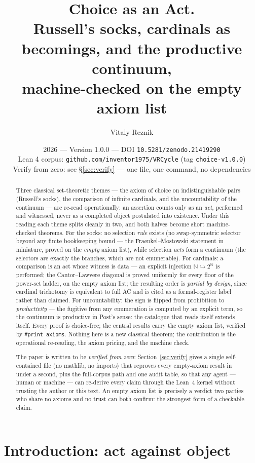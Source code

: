 \documentclass[11pt]{article}
\title{\textbf{Choice as an Act.}\\[2pt]
\large Russell's socks, cardinals as becomings, and the productive
continuum,\\ machine-checked on the empty axiom list}
\author{Vitaly Reznik}
\date{2026 --- Version 1.0.0 --- DOI \texttt{10.5281/zenodo.21419290}\\[2pt]
\small Lean 4 corpus: \texttt{github.com/inventor1975/VRCycle} (tag
\texttt{choice-v1.0.0})\\
\small Verify from zero: see \S\ref{sec:verify} --- one file, one command,
no dependencies}
\theoremstyle{remark}
\newcommand{\N}{\mathbb{N}}
\begin{document}
\maketitle

\begin{abstract}
Three classical set-theoretic themes --- the axiom of choice on
indistinguishable pairs (Russell's socks), the comparison of infinite
cardinals, and the uncountability of the continuum --- are re-read
operationally: an assertion counts only as an \emph{act}, performed and
witnessed, never as a completed object postulated into existence.  Under
this reading each theme splits cleanly in two, and both halves become
short machine-checked theorems.  For the socks: no selection \emph{rule}
exists (no swap-symmetric selector beyond any finite bookkeeping bound
--- the Fraenkel--Mostowski statement in miniature, proved on the
\emph{empty} axiom list), while selection \emph{acts} form a continuum
(the selectors are exactly the branches, which are not enumerable).  For
cardinals: a comparison is an act whose witness is data --- an explicit
injection $\N \hookrightarrow 2^{\N}$ is performed; the Cantor--Lawvere
diagonal is proved uniformly for every floor of the power-set ladder, on
the empty axiom list; the resulting order is \emph{partial by design},
since cardinal trichotomy is equivalent to full AC and is cited as a
formal-register label rather than claimed.  For uncountability: the sign
is flipped from prohibition to \emph{productivity} --- the fugitive from
any enumeration is computed by an explicit term, so the continuum is
productive in Post's sense: the catalogue that reads itself extends
itself.  Every proof is choice-free; the central results carry the empty
axiom list, verified by \texttt{\#print axioms}.  Nothing here is a new
classical theorem; the contribution is the operational re-reading, the
axiom pricing, and the machine check.

The paper is written to be \emph{verified from zero}: Section~\ref{sec:verify}
gives a single self-contained file (no mathlib, no imports) that reproves
every empty-axiom result in under a second, plus the full-corpus path and
one audit table, so that any agent --- human or machine --- can re-derive
every claim through the Lean~4 kernel without trusting the author or this
text.  An empty axiom list is precisely a verdict two parties who share
no axioms and no trust can both confirm: the strongest form of a
checkable claim.
\end{abstract}

\section{Introduction: act against object}
\end{document}
